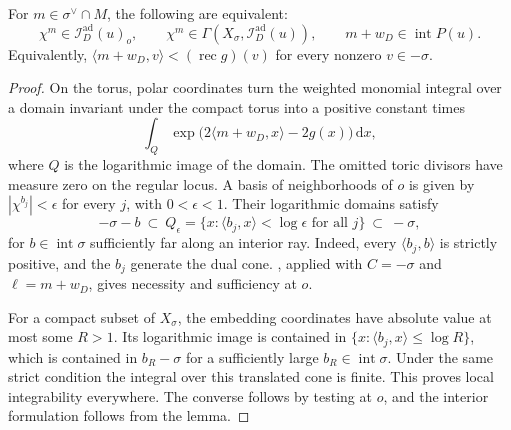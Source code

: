 \begin{theorem}\label{thm:affine-toric-adapted-monomials}
For $m\in\sigma^\vee\cap M$, the following are equivalent:
\[
 \chi^m\in\mathcal I_D^{\mathrm{ad}}(u)_o,
 \qquad
 \chi^m\in\Gamma(X_\sigma,\mathcal I_D^{\mathrm{ad}}(u)),
 \qquad
 m+w_D\in\operatorname{int}P(u).
\]
Equivalently, $\langle m+w_D,v\rangle<(\operatorname{rec}g)(v)$ for every nonzero $v\in-\sigma$.
\end{theorem}
\begin{proof}
On the torus, polar coordinates turn the weighted monomial integral over a domain invariant under the compact torus into a positive constant times
\[
 \int_Q\exp\bigl(2\langle m+w_D,x\rangle-2g(x)\bigr)\,\mathrm dx,
\]
where $Q$ is the logarithmic image of the domain. The omitted toric divisors have measure zero on the regular locus. A basis of neighborhoods of $o$ is given by $|\chi^{b_j}|<\epsilon$ for every $j$, with $0<\epsilon<1$. Their logarithmic domains satisfy
\begin{equation}\label{eq:toric-logarithmic-neighborhood-sandwich}
 -\sigma-b\ \subset\
 Q_\epsilon=\{x:\langle b_j,x\rangle<\log\epsilon\text{ for all }j\}
 \ \subset\ -\sigma,
\end{equation}
for $b\in\operatorname{int}\sigma$ sufficiently far along an interior ray. Indeed, every $\langle b_j,b\rangle$ is strictly positive, and the $b_j$ generate the dual cone. , applied with $C=-\sigma$ and $\ell=m+w_D$, gives necessity and sufficiency at $o$.

For a compact subset of $X_\sigma$, the embedding coordinates have absolute value at most some $R>1$. Its logarithmic image is contained in $\{x:\langle b_j,x\rangle\leq\log R\}$, which is contained in $b_R-\sigma$ for a sufficiently large $b_R\in\operatorname{int}\sigma$. Under the same strict condition the integral over this translated cone is finite. This proves local integrability everywhere. The converse follows by testing at $o$, and the interior formulation follows from the lemma.
\end{proof}

